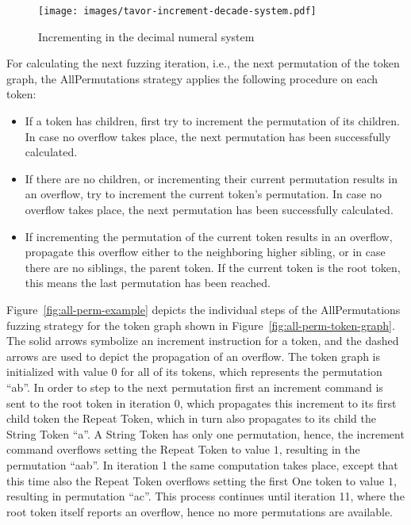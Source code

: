\begin{figure}
\texttt{[image: images/tavor-increment-decade-system.pdf]}
\caption{Incrementing in the decimal numeral system}
\label{fig:inc-decade-system}
\end{figure}

For calculating the next fuzzing iteration, i.e., the next permutation of the token graph, the AllPermutations strategy applies the following procedure on each token:
\begin{itemize}
\item If a token has children, first try to increment the permutation of its children. In case no overflow takes place, the next permutation has been successfully calculated.
\item If there are no children, or incrementing their current permutation results in an overflow, try to increment the current token's permutation. In case no overflow takes place, the next permutation has been successfully calculated.
\item If incrementing the permutation of the current token results in an overflow, propagate this overflow either to the neighboring higher sibling, or in case there are no siblings, the parent token. If the current token is the root token, this means the last permutation has been reached.
\end{itemize}

Figure~\ref{fig:all-perm-example} depicts the individual steps of the AllPermutations fuzzing strategy for the token graph shown in Figure~\ref{fig:all-perm-token-graph}. The solid arrows symbolize an increment instruction for a token, and the dashed arrows are used to depict the propagation of an overflow. The token graph is initialized with value 0 for all of its tokens, which represents the permutation \enquote{ab}. In order to step to the next permutation first an increment command is sent to the root token in iteration 0, which propagates this increment to its first child token the Repeat Token, which in turn also propagates to its child the String Token \enquote{a}. A String Token has only one permutation, hence, the increment command overflows setting the Repeat Token to value $1$, resulting in the permutation \enquote{aab}. In iteration 1 the same computation takes place, except that this time also the Repeat Token overflows setting the first One token to value $1$, resulting in permutation \enquote{ac}. This process continues until iteration 11, where the root token itself reports an overflow, hence no more permutations are available.

